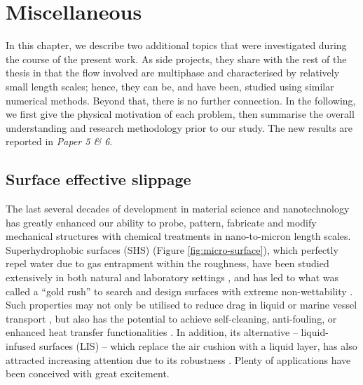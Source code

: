 \chapter{Miscellaneous}  \label{chp:misc}


In this chapter, we describe two additional topics that were investigated during the course of the present work.
As side projects, they share with the rest of the thesis in that the flow involved are multiphase and characterised by relatively small length scales; hence, they can be, and have been, studied using similar numerical methods.
Beyond that, there is no further connection.
In the following, we first give the physical motivation of each problem, then summarise the overall understanding and research methodology prior to our study.
The new results are reported in \emph{Paper 5 \& 6}.


\section{Surface effective slippage}

The last several decades of development in material science and nanotechnology has greatly enhanced our ability to probe, pattern, fabricate and modify mechanical structures with chemical treatments in nano-to-micron length scales.
Superhydrophobic surfaces (SHS) (Figure \ref{fig:micro-surface}), which perfectly repel water due to gas entrapment within the roughness, have been studied extensively in both natural and laboratory settings \citep{plant_superhydro_1997, Onda_etal_1996}, and has led to what was called a ``gold rush'' to search and design surfaces with extreme non-wettability \citep{Bocquet}.
Such properties may not only be utilised to reduce drag in liquid or marine vessel transport \citep{Watanabe, Ou, Choi_Kim, Lee}, but also has the potential to achieve self-cleaning, anti-fouling, or enhanced heat transfer functionalities \citep{Blossey2003, Roach_etal_2008}.
In addition, its alternative -- liquid-infused surfaces (LIS) -- which replace the air cushion with a liquid layer, has also attracted increasing attention due to its robustness \citep{Solomon, Rosenberg, Wexler}.
Plenty of applications have been conceived with great excitement.

